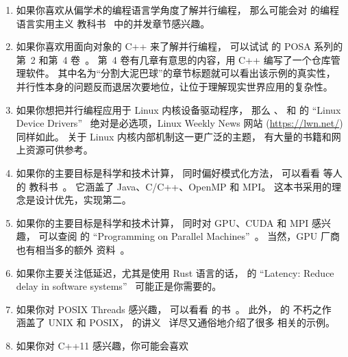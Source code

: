 \begin{enumerate}
	然而，那些可能怀疑该教科书第一作者对 RCU 持敌意态度的读者，
	应参考其一篇论文~\cite{Balmau:2016:FRM:2935764.2935790}
	第一页最后一个完整句子。
	这个句子写道：``QSBR [一类特定的 RCU 实现] 速度快，
	可以应用于几乎任何数据结构。''
	这显然不是一个对 RCU 持敌意态度的人会说的话。
\item	如果你喜欢从偏学术的编程语言学角度了解并行编程，
	那么可能会对  的编程语言实用主义
	教科书~\cite{MichaelScott2006Textbook,MichaelScott2015Textbook}
	中的并发章节感兴趣。
\item	如果你喜欢用面向对象的 C++ 来了解并行编程，
	可以试试  的 POSA 系列的
	第~2 和第~4 卷~\cite{SchmidtStalRohnertBuschmann2000v2Textbook,
	BuschmannHenneySchmidt2007v4Textbook}。
	第~4 卷有几章有意思的内容，用 C++ 编写了一个仓库管理软件。
	其中名为``分割大泥巴球''的章节标题就可以看出该示例的真实性，
	并行性本身的问题反而退居次要地位，让位于理解现实世界应用的复杂性。
\item	如果你想把并行编程应用于 Linux 内核设备驱动程序，
	那么 、
	和  的
	``Linux Device Drivers''~\cite{CorbetRubiniKroahHartman}
	绝对是必选项，Linux Weekly News 网站
	(\url{https://lwn.net/}) 同样如此。
	关于 Linux 内核内部机制这一更广泛的主题，
	有大量的书籍和网上资源可供参考。
\item	如果你的主要目标是科学和技术计算，
	同时偏好模式化方法，
	可以看看  等人的
	教科书~\cite{Mattson2005Textbook}。
	它涵盖了 Java、C/C++、OpenMP 和 MPI\@。
	这本书采用的理念是设计优先，实现第二。
\item	如果你的主要目标是科学和技术计算，
	同时对 GPU、CUDA 和 MPI 感兴趣，
	可以查阅  的
	``Programming on Parallel Machines''~\cite{NormMatloff2017ParProcBook}。
	当然，GPU 厂商也有相当多的额外
	资料~\cite{AMD2020ROCm,CyrilZeller2011GPGPUbasics,NVidia2017GPGPU,NVidia2017GPGPU-university}。
\item	如果你主要关注低延迟，尤其是使用 Rust 语言的话，
	 的
	``Latency: Reduce delay in software
	systems''~\cite{PekkaEnberg2026Latency}
	可能正是你需要的。
\item	如果你对 POSIX Threads 感兴趣，
	可以看看  的书~\cite{Butenhof1997pthreads}。
	此外， 的
	不朽之作~\cite{WRichardStevens1992,WRichardStevens2013}
	涵盖了 UNIX 和 POSIX， 的讲义
	~\cite{StewartWeiss2013UNIX}详尽又通俗地介绍了很多
	相关的示例。
\item	如果你对 C++11 感兴趣，你可能会喜欢

\end{enumerate}
